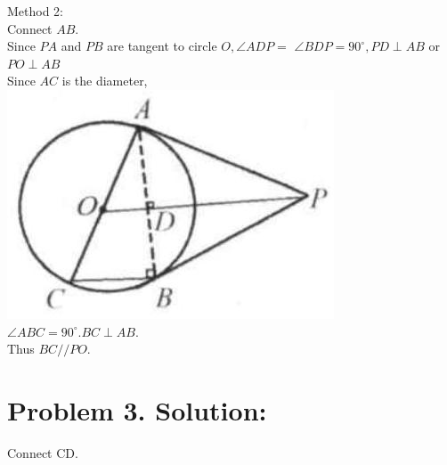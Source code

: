 \documentclass[10pt]{article}
\begin{document}
Method 2:\\
Connect \(A B\).\\
Since \(P A\) and \(P B\) are tangent to circle \(O, \angle A D P=\) \(\angle B D P=90^{\circ}, P D \perp A B\) or \(P O \perp A B\)\\
Since \(A C\) is the diameter,\\
\includegraphics[max width=\textwidth]{2025_04_17_97bc1f7e44d93c271a88g-171(2)} \(\angle A B C=90^{\circ} . B C \perp A B\).\\
Thus \(B C / / P O\).

\section*{Problem 3. Solution:}
Connect CD.
\end{document}
